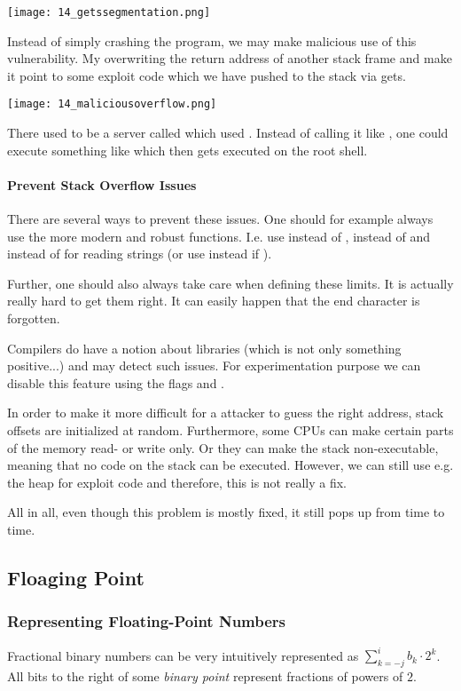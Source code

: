 \texttt{[image: 14\_getssegmentation.png]}

Instead of simply crashing the program, we may make malicious use of this vulnerability. My overwriting the return address of another stack frame and make it point to some exploit code which we have pushed to the stack via gets.

\texttt{[image: 14\_maliciousoverflow.png]}

There used to be a server called  which used . Instead of calling it like , one could execute something like  which then gets executed on the root shell.

\paragraph{Prevent Stack Overflow Issues}
There are several ways to prevent these issues. One should for example always use the more modern and robust functions. I.e. use  instead of ,  instead of  and  instead of  for reading strings (or use  instead if ).

Further, one should also always take care when defining these limits. It is actually really hard to get them right. It can easily happen that the end character is forgotten.

Compilers do have a notion about libraries (which is not only something positive...) and may detect such issues. For experimentation purpose we can disable this feature using the flags  and .

In order to make it more difficult for a attacker to guess the right address, stack offsets are initialized at random. Furthermore, some CPUs can make certain parts of the memory read- or write only. Or they can make the stack non-executable, meaning that no code on the stack can be executed. However, we can still use e.g. the heap for exploit code and therefore, this is not really a fix.

All in all, even though this problem is mostly  fixed, it still pops up from time to time. 

\subsection*{Floaging Point}
\subsubsection{Representing Floating-Point Numbers}
Fractional binary numbers can be very intuitively represented as $\sum_{k=-j}^{i} b_k \cdot 2^k$. All bits to the right of some \textit{binary point} represent fractions of powers of $2$.

